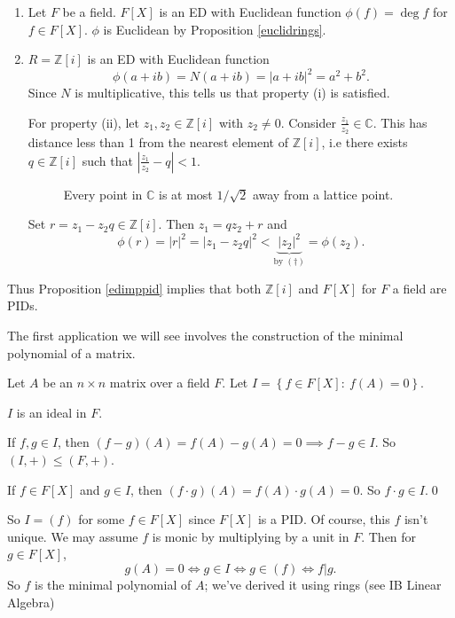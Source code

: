 \documentclass[egregdoesnotlikesansseriftitles,a4paper]{scrartcl}
\begin{document}
\begin{example*}
      \begin{enumerate}
            \item Let $F$ be a field. $F[X]$ is an ED with Euclidean function $\phi (f)=\operatorname{deg} f$ for $f \in F[X]$. $\phi$ is Euclidean by Proposition \ref{euclidrings}.
            \item $R=\mathbb{Z}[i]$ is an ED with Euclidean function 
            \begin{equation}\tag{$\dagger$}
                  \phi (a+ib )=N (a+ib)= \left|a+ib \right|^2 =a^2+b^2. 
            \end{equation}
             Since $N$ is multiplicative, this tells us that property (i) is satisfied. 

            For property (ii), let $z_1 , z_2 \in \mathbb{Z}[i]$ with $z_2 \neq 0$. Consider $\frac{z_1}{z_2 } \in \mathbb{C}$. This has distance less than 1 from the nearest element of $\mathbb{Z}[i]$, i.e there exists $q \in \mathbb{Z}[i]$ such that $\left|\frac{z_1}{z_2 }-q\right|<1$.
            \begin{figure}[H]
                  \centering
                  \caption{Every point in $\mathbb{C}$ is at most $1/\sqrt{2}$ away from a lattice point.}
            \end{figure}
            Set $r=z_1 -z_2 q \in \mathbb{Z}[i]$. Then $z_1 =qz_2 +r$ and \[
            \phi (r)=\left|r\right|^2=\left|z_1 -z_2 q\right|^2< \underbrace{\left|z_2 \right|^2 }_{\text{by } (\dagger)} =\phi (z_2 )
            .\]
      \end{enumerate}
      Thus Proposition \ref{edimppid} implies that both $\mathbb{Z}[i]$ and $F[X]$ for $F$ a field are PIDs.
\end{example*}
The first application we will see involves the construction of the minimal polynomial of a matrix.
\begin{example*}
       Let $A$ be an $n \times n$ matrix over a field $F$. Let $I=\left\{f \in F[X]: \ f (A)=0\right\}$. 
       \begin{claim}
             $I$ is an ideal in $F$.
       \end{claim}
       \begin{prooff}
              If $f,g \in I$, then $(f-g)(A)=f (A)- g (A)=0 \implies f-g \in I$. So $(I,+)\leq (F,+)$. 
              
              If $f \in F[X]$ and $g \in I$, then $(f \cdot g)(A)=f (A)\cdot g (A)=0$. So $f \cdot g \in I$.\hfill \qed
       \end{prooff}
       So $I = (f)$ for some $f \in F[X]$ since $F[X]$ is a PID. Of course, this $f$ isn't unique. We may assume $f$ is monic by multiplying by a unit in $F$. Then for $g \in F[X]$, \[
            g (A)=0 \iff g \in I \iff g \in (f) \iff f|g
       .\] So $f$ is the minimal polynomial of $A$; we've derived it using rings (see IB Linear Algebra)
\end{example*}
\end{document}
